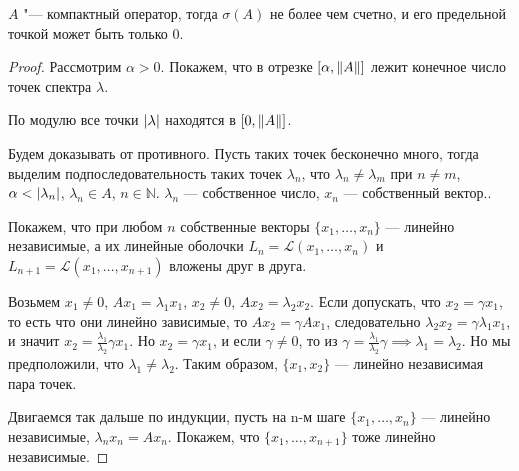 \documentclass{article}
\begin{document}
\begin{theorem}
    $A$ "--- компактный оператор, тогда $\sigma(A)$ не
    более чем счетно, и его предельной точкой может быть только 0.
\end{theorem}
\begin{proof}
    Рассмотрим $\alpha > 0$. Покажем, что в отрезке $[\alpha,  \left\|A\right\|]$ лежит конечное число точек спектра $\lambda$.
    
    По модулю все точки $\left|\lambda\right|$ находятся в $[0, \left\|A\right\|]$.
    


    Будем доказывать от противного. Пусть таких точек бесконечно много, тогда выделим подпоследовательность таких точек $\lambda_{n}$, что $\lambda_{n} \neq \lambda_{m}$ при $n \neq m$, $\alpha < \left|\lambda_{n}\right|$, $\lambda_{n} \in A$, $n \in \mathbb{N}$. $\lambda_{n}$ --- собственное число, $x_{n}$ --- собственный вектор..
    
    Покажем, что при любом $n$ собственные векторы $\{x_{1}, \dotso, x_{n}\}$ --- линейно независимые, а их линейные оболочки $L_{n} = \mathcal{L}(x_{1}, \dotso, x_{n})$ и $L_{n+1} = \mathcal{L}(x_{1}, \dotso, x_{n+1})$ вложены друг в друга. 
    
    Возьмем $x_{1} \neq 0$, $Ax_{1} = \lambda_{1}x_{1}$, $x_{2} \neq 0$, $Ax_{2} = \lambda_{2}x_{2}$. 
    Если допускать, что $x_{2} = \gamma x_{1}$, то есть что они линейно зависимые, то $Ax_{2} = \gamma Ax_{1}$, следовательно $\lambda_{2}x_{2} = \gamma \lambda_{1}x_{1}$, и значит $x_{2} = \frac{\lambda_{1}}{\lambda_{2}} \gamma x_{1}$. Но $x_{2} = \gamma x_{1}$, и если $\gamma \neq 0$, то из $\gamma = \frac{\lambda_{1}}{\lambda_{2}} \gamma \implies \lambda_{1} = \lambda_{2}$. Но мы предположили, что $\lambda_{1} \neq \lambda_{2}$.
    Таким образом, $\{x_{1}, x_{2}\}$ --- линейно независимая пара точек.
    
    Двигаемся так дальше по индукции, пусть на n-м шаге $\{x_{1}, \dotso, x_{n}\}$ --- линейно независимые, $\lambda_{n}x_{n} = A x_{n}$. Покажем, что $\{x_{1}, \dotso, x_{n+1}\}$ тоже линейно независимые.
    

\end{proof}
\end{document}
